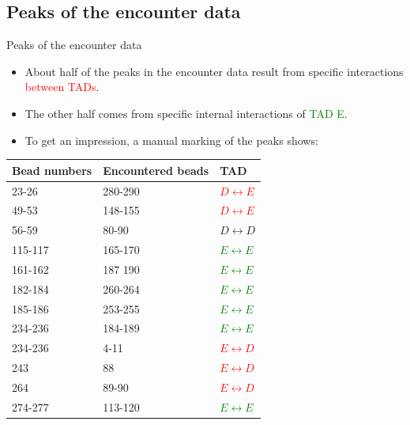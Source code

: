 \documentclass[8pt]{beamer}
\begin{document}
\subsection{Peaks of the encounter data}
\begin{frame}{Peaks of the encounter data}
\begin{itemize}
\item About half of the peaks in the encounter data result from specific interactions \textcolor{red}{between TADs}.
\item The other half comes from specific internal interactions of \textcolor{green}{TAD E}.
\item To get an impression, a manual marking of the peaks shows: 
\end{itemize}
\begin{table}[H]\label{nonNeighborBeadEncounterTable}
\begin{tabular}{l l l}
Bead numbers & Encountered beads & TAD\\
\hline
23-26   & 280-290 & \textcolor{red}{$D\leftrightarrow E$}\\
49-53   & 148-155 & \textcolor{red}{$D\leftrightarrow E$}\\
56-59   & 80-90   & $D\leftrightarrow D$\\
115-117 & 165-170 & \textcolor{green}{$E\leftrightarrow E$}\\
161-162 & 187 190 & \textcolor{green}{$E\leftrightarrow E$}\\
182-184 & 260-264 & \textcolor{green}{$E\leftrightarrow E$}\\
185-186 & 253-255 & \textcolor{green}{$E\leftrightarrow E$}\\
234-236 & 184-189 & \textcolor{green}{$E\leftrightarrow E$}\\
234-236 & 4-11    & \textcolor{red}{$E\leftrightarrow D$}\\
243     & 88      & \textcolor{red}{$E\leftrightarrow D$}\\
264     & 89-90   & \textcolor{red}{$E\leftrightarrow D$}\\
274-277 & 113-120 & \textcolor{green}{$E\leftrightarrow E$}
\end{tabular}
\end{table} 
\end{frame}
\end{document}
